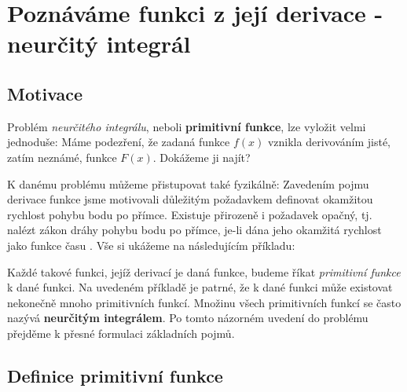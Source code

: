 \setchaptertoc
\chapter{Poznáváme funkci z její derivace - neurčitý integrál}\label{mai:IchapVII}
  \section{Motivace}
    Problém \emph{neurčitého integrálu}, neboli \textbf{primitivní funkce}, lze vyložit velmi 
    jednoduše: Máme podezření, že zadaná funkce \(f(x)\) vznikla derivováním jisté, zatím neznámé, 
    funkce \(F(x)\). Dokážeme ji najít? 
  
    K danému problému můžeme přistupovat také fyzikálně: Zavedením pojmu derivace funkce jsme 
    motivovali důležitým požadavkem definovat okamžitou rychlost pohybu bodu po přímce. Existuje 
    přirozeně i požadavek opačný, tj. nalézt zákon dráhy pohybu bodu po přímce, je-li dána jeho 
    okamžitá rychlost jako funkce času \cite[s.~253]{Brabec1989}. Vše si ukážeme na následujícím 
    příkladu:      
    
    Každé takové funkci, jejíž derivací je daná funkce, budeme říkat \emph{primitivní funkce} k 
    dané funkci. Na uvedeném příkladě je patrné, že k dané funkci může existovat nekonečně mnoho 
    primitivních funkcí. Množinu všech primitivních funkcí se často nazývá \textbf{neurčitým 
    integrálem}. Po tomto názorném uvedení do problému přejděme k přesné formulaci základních pojmů.
    
  \section{Definice primitivní funkce}\label{mai:IchapVIIsecI}  
  
